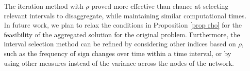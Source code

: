 \documentclass[smallextended,natbib]{svjour3}       %
\numberwithin{theorem}{section}
\begin{document}
The iteration method with $\rho$ proved more effective than chance at selecting relevant intervals to disaggregate, while maintaining similar computational times.
In future work, we plan to relax the conditions in Proposition \ref{prop rho} for the feasibility of the aggregated solution for the original problem. Furthermore, the interval selection method can be refined by considering other indices based on \(\rho\), such as the frequency of sign changes over time within a time interval, or by using other measures instead of the variance across the nodes of the network.









\color{black}




%
%









\end{document}
